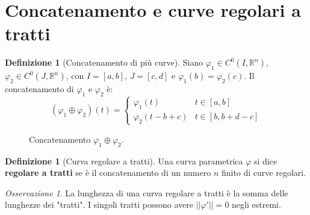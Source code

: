 \documentclass[11pt, a4paper, openright]{book}
\theoremstyle{plain}
\theoremstyle{definition}
\newtheorem{definizione}[teorema]{Definizione}
\theoremstyle{remark}
\newtheorem{osservazione}[teorema]{Osservazione}
\begin{document}
\section{Concatenamento e curve regolari a tratti}
\begin{definizione}[Concatenamento di più curve]
    Siano $\varphi_1 \in C^0(I, \mathbb{R}^n)$, $\varphi_2 \in C^0(J, \mathbb{R}^n)$, con $I = [a, b]$, $J = [c, d]$ e $\varphi_1(b) = \varphi_2(c)$. Il concatenamento di $\varphi_1$ e $\varphi_2$ è:
    \begin{equation}
        (\varphi_1 \oplus \varphi_2)(t) = \begin{cases}
            \varphi_1(t) & t \in [a, b] \\
            \varphi_2(t - b + c) & t \in [b, b + d - c]
        \end{cases}
    \end{equation}
\begin{figure}[H]
    \centering
    \caption{Concatenamento $\varphi_1 \oplus \varphi_2$.}
\end{figure}
\end{definizione}

\begin{definizione}[Curva regolare a tratti]
    Una curva parametrica $\varphi$ si dice \textbf{regolare a tratti} se è il concatenamento di un numero $n$ finito di curve regolari.
\end{definizione}

\begin{osservazione}
    La lunghezza di una curva regolare a tratti è la somma delle lunghezze dei "tratti". I singoli tratti possono avere $||\varphi'|| = 0$ negli estremi.
\end{osservazione}
\end{document}
